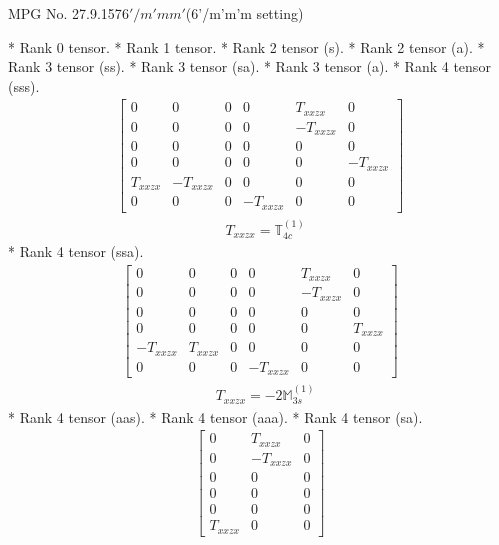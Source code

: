 \documentclass[fleqn,8pt,landscape]{jsarticle}
\begin{document}
\setcounter{MaxMatrixCols}{32}

\renewcommand{\tablename}{Table~}
\renewcommand{\figurename}{Figure~}
\begin{center}
\LARGE
MPG No. 27.9.157\quad$6'/m'mm'$\quad(6'/m'm'm setting)
\end{center}
* Rank 0 tensor.
* Rank 1 tensor.
* Rank 2 tensor (s).
* Rank 2 tensor (a).
* Rank 3 tensor (ss).
* Rank 3 tensor (sa).
* Rank 3 tensor (a).
* Rank 4 tensor (sss).
\begin{align*}
\begin{bmatrix} 0 & 0 & 0 & 0 & T_{xxzx} & 0 \\ 0 & 0 & 0 & 0 & - T_{xxzx} & 0 \\ 0 & 0 & 0 & 0 & 0 & 0 \\ 0 & 0 & 0 & 0 & 0 & - T_{xxzx} \\ T_{xxzx} & - T_{xxzx} & 0 & 0 & 0 & 0 \\ 0 & 0 & 0 & - T_{xxzx} & 0 & 0 \end{bmatrix}
\end{align*}
\begin{align*}
& T_{xxzx} = \mathbb{T}_{4c}^{(1)}
\end{align*}
* Rank 4 tensor (ssa).
\begin{align*}
\begin{bmatrix} 0 & 0 & 0 & 0 & T_{xxzx} & 0 \\ 0 & 0 & 0 & 0 & - T_{xxzx} & 0 \\ 0 & 0 & 0 & 0 & 0 & 0 \\ 0 & 0 & 0 & 0 & 0 & T_{xxzx} \\ - T_{xxzx} & T_{xxzx} & 0 & 0 & 0 & 0 \\ 0 & 0 & 0 & - T_{xxzx} & 0 & 0 \end{bmatrix}
\end{align*}
\begin{align*}
& T_{xxzx} = - 2 \mathbb{M}_{3s}^{(1)}
\end{align*}
* Rank 4 tensor (aas).
* Rank 4 tensor (aaa).
* Rank 4 tensor (sa).
\begin{align*}
\begin{bmatrix} 0 & T_{xxzx} & 0 \\ 0 & - T_{xxzx} & 0 \\ 0 & 0 & 0 \\ 0 & 0 & 0 \\ 0 & 0 & 0 \\ T_{xxzx} & 0 & 0 \end{bmatrix}
\end{align*}
\end{document}

